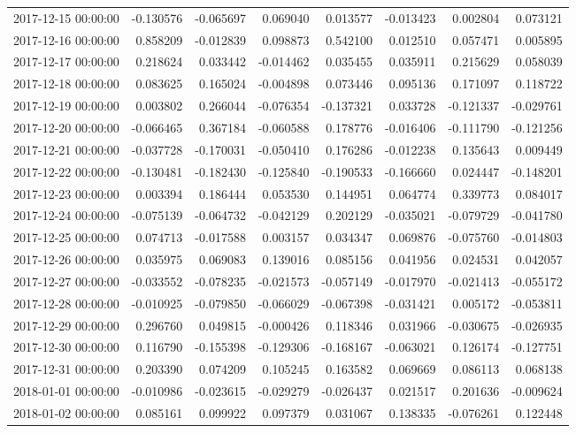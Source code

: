 \begin{tabular}{lrrrrrrr}
2017-12-15 00:00:00 & -0.130576 & -0.065697 & 0.069040 & 0.013577 & -0.013423 & 0.002804 & 0.073121 \\
2017-12-16 00:00:00 & 0.858209 & -0.012839 & 0.098873 & 0.542100 & 0.012510 & 0.057471 & 0.005895 \\
2017-12-17 00:00:00 & 0.218624 & 0.033442 & -0.014462 & 0.035455 & 0.035911 & 0.215629 & 0.058039 \\
2017-12-18 00:00:00 & 0.083625 & 0.165024 & -0.004898 & 0.073446 & 0.095136 & 0.171097 & 0.118722 \\
2017-12-19 00:00:00 & 0.003802 & 0.266044 & -0.076354 & -0.137321 & 0.033728 & -0.121337 & -0.029761 \\
2017-12-20 00:00:00 & -0.066465 & 0.367184 & -0.060588 & 0.178776 & -0.016406 & -0.111790 & -0.121256 \\
2017-12-21 00:00:00 & -0.037728 & -0.170031 & -0.050410 & 0.176286 & -0.012238 & 0.135643 & 0.009449 \\
2017-12-22 00:00:00 & -0.130481 & -0.182430 & -0.125840 & -0.190533 & -0.166660 & 0.024447 & -0.148201 \\
2017-12-23 00:00:00 & 0.003394 & 0.186444 & 0.053530 & 0.144951 & 0.064774 & 0.339773 & 0.084017 \\
2017-12-24 00:00:00 & -0.075139 & -0.064732 & -0.042129 & 0.202129 & -0.035021 & -0.079729 & -0.041780 \\
2017-12-25 00:00:00 & 0.074713 & -0.017588 & 0.003157 & 0.034347 & 0.069876 & -0.075760 & -0.014803 \\
2017-12-26 00:00:00 & 0.035975 & 0.069083 & 0.139016 & 0.085156 & 0.041956 & 0.024531 & 0.042057 \\
2017-12-27 00:00:00 & -0.033552 & -0.078235 & -0.021573 & -0.057149 & -0.017970 & -0.021413 & -0.055172 \\
2017-12-28 00:00:00 & -0.010925 & -0.079850 & -0.066029 & -0.067398 & -0.031421 & 0.005172 & -0.053811 \\
2017-12-29 00:00:00 & 0.296760 & 0.049815 & -0.000426 & 0.118346 & 0.031966 & -0.030675 & -0.026935 \\
2017-12-30 00:00:00 & 0.116790 & -0.155398 & -0.129306 & -0.168167 & -0.063021 & 0.126174 & -0.127751 \\
2017-12-31 00:00:00 & 0.203390 & 0.074209 & 0.105245 & 0.163582 & 0.069669 & 0.086113 & 0.068138 \\
2018-01-01 00:00:00 & -0.010986 & -0.023615 & -0.029279 & -0.026437 & 0.021517 & 0.201636 & -0.009624 \\
2018-01-02 00:00:00 & 0.085161 & 0.099922 & 0.097379 & 0.031067 & 0.138335 & -0.076261 & 0.122448 \\

\end{tabular}
